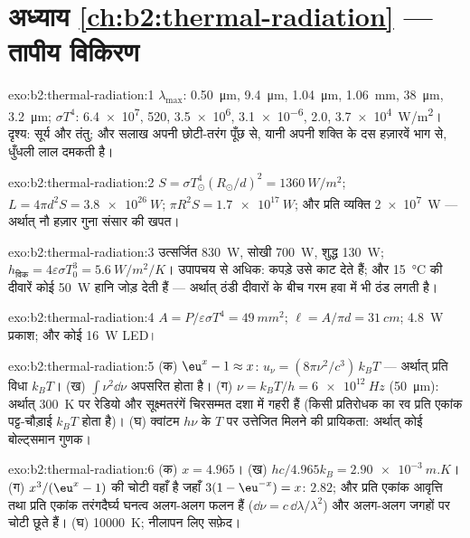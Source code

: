 \section*{अध्याय \ref{ch:b2:thermal-radiation} --- तापीय विकिरण}

\begin{solution}{exo:b2:thermal-radiation:1}
$\lambda_{\max}$: \qty{0.50}{\micro m}, \qty{9.4}{\micro m}, \qty{1.04}{\micro m},
\qty{1.06}{mm}, \qty{38}{\micro m}, \qty{3.2}{\micro m}; $\sigma T^4$: \qty{6.4e7}{},
\qty{520}{}, \qty{3.5e6}{}, \qty{3.1e-6}{}, \qty{2.0}{}, \qty{3.7e4}{W/m^2}। दृश्य:
सूर्य और तंतु; और सलाख अपनी छोटी-तरंग पूँछ से, यानी अपनी शक्ति के दस
हज़ारवें भाग से, धुँधली लाल दमकती है।
\end{solution}

\begin{solution}{exo:b2:thermal-radiation:2}
$S = \sigma T_\odot^4(R_\odot/d)^2 = \qty{1360}{W/m^2}$; $L = 4\pi d^2S =
\qty{3.8e26}{W}$; $\pi R^2S = \qty{1.7e17}{W}$; और प्रति व्यक्ति \qty{2e7}{W} --- अर्थात् नौ
हज़ार गुना संसार की खपत।
\end{solution}

\begin{solution}{exo:b2:thermal-radiation:3}
उत्सर्जित \qty{830}{W}, सोखी \qty{700}{W}, शुद्ध \qty{130}{W}; $h_{\text{विक}} =
4\varepsilon\sigma T_0^3 = \qty{5.6}{W/m^2/K}$। उपापचय से अधिक:
कपड़े उसे काट देते हैं; और \qty{15}{\celsius} की दीवारें कोई \qty{50}{W} हानि जोड़ देती हैं
--- अर्थात् ठंडी दीवारों के बीच गरम हवा में भी ठंड लगती है।
\end{solution}

\begin{solution}{exo:b2:thermal-radiation:4}
$A = P/\varepsilon\sigma T^4 = \qty{49}{mm^2}$; $\ell = A/\pi d = \qty{31}{cm}$;
\qty{4.8}{W} प्रकाश; और कोई \qty{16}{W} LED।
\end{solution}

\begin{solution}{exo:b2:thermal-radiation:5}
(क) $\eu^x - 1 \approx x$: $u_\nu = (8\pi\nu^2/c^3)\,k_BT$ --- अर्थात् प्रति विधा $k_BT$।
(ख) $\int\nu^2\dd\nu$ अपसरित होता है। (ग) $\nu = k_BT/h = \qty{6e12}{Hz}$ (\qty{50}{\micro m}):
अर्थात् \qty{300}{K} पर रेडियो और सूक्ष्मतरंगें चिरसम्मत दशा में गहरी हैं (किसी
प्रतिरोधक का रव प्रति एकांक पट्ट-चौड़ाई $k_BT$ होता है)। (घ) क्वांटम $h\nu$ के
$T$ पर उत्तेजित मिलने की प्रायिकता: अर्थात् कोई बोल्ट्समान गुणक।
\end{solution}

\begin{solution}{exo:b2:thermal-radiation:6}
(क) $x = 4.965$। (ख) $hc/4.965k_B = \qty{2.90e-3}{m.K}$। (ग) $x^3/(\eu^x - 1)$
की चोटी वहाँ है जहाँ $3(1 - \eu^{-x}) = x$: $2.82$; और प्रति एकांक आवृत्ति
तथा प्रति एकांक तरंगदैर्घ्य घनत्व अलग-अलग फलन हैं ($\dd\nu = c\,\dd\lambda/\lambda^2$)
और अलग-अलग जगहों पर चोटी छूते हैं। (घ) \qty{10000}{K}; नीलापन लिए सफ़ेद।
\end{solution}

